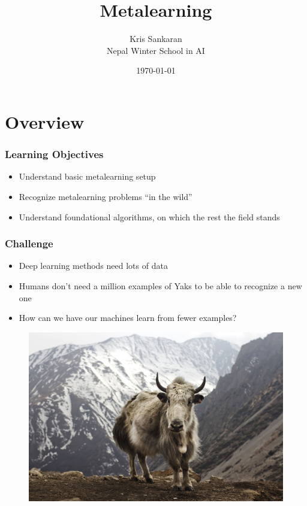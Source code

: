 \documentclass[10pt,mathserif]{beamer}
\title{\large \bfseries Metalearning}
\author{Kris Sankaran\\[3ex]
Nepal Winter School in AI}
\date{\today}
\begin{document}
\frame{
  \thispagestyle{empty}
  \titlepage
}

\section{Overview}
\begin{frame}
\frametitle{Learning Objectives}
\begin{itemize}\itemsep=12pt
\item Understand basic metalearning setup
\item Recognize metalearning problems ``in the wild''
\item Understand foundational algorithms, on which the rest the
  field stands
\end{itemize}
\end{frame}

\begin{frame}
  \frametitle{Challenge}
  \begin{itemize}\itemsep=12pt
  \item Deep learning methods need lots of data
  \item Humans don't need a million examples of Yaks to be able to recognize
    a new one
  \item How can we have our machines learn from fewer examples?
  \end{itemize}
  \begin{figure}
    \includegraphics[width=0.4\paperwidth]{figure/yak}
  \end{figure}
\end{frame}
\end{document}
